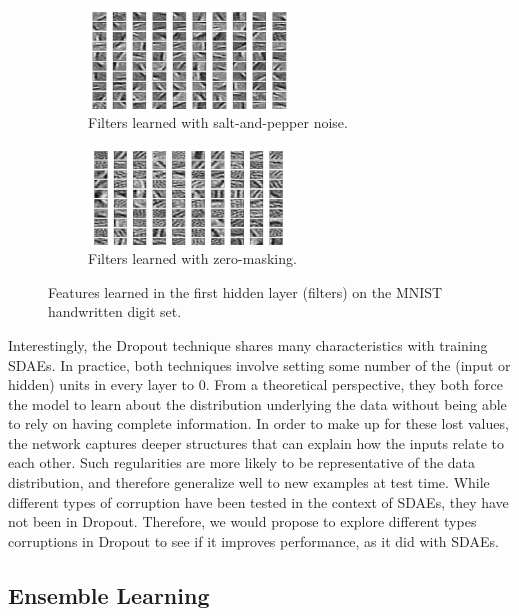 \documentclass{article} %
\begin{document}
\begin{figure}
\centering
\begin{subfigure}{.5\textwidth}
  \centering
  \includegraphics[width=150pt]{SDAE_Filters_SaltAndPepperNoise.png}
  \caption{Filters learned with salt-and-pepper noise.}
  \label{fig:filters_sp}
\end{subfigure}%
\begin{subfigure}{.5\textwidth}
  \centering
  \includegraphics[width=150pt]{SDAE_Filters_ZeroMasking.png}
  \caption{Filters learned with zero-masking.}
  \label{fig:filters_sp}
\end{subfigure}
\caption{Features learned in the first hidden layer (filters) on the MNIST handwritten digit set.}
\label{fig:filters}
\end{figure}

Interestingly, the Dropout technique shares many characteristics with training SDAEs. In practice, both techniques involve setting some number of the (input or hidden) units in every layer to 0. From a theoretical perspective, they both force the model to learn about the distribution underlying the data without being able to rely on having complete information. In order to make up for these lost values, the network captures deeper structures that can explain how the inputs relate to each other. Such regularities are more likely to be representative of the data distribution, and therefore generalize well to new examples at test time. While different types of corruption have been tested in the context of SDAEs, they have not been in Dropout. Therefore, we would propose to explore different types corruptions in Dropout to see if it improves performance, as it did with SDAEs.

\subsection{Ensemble Learning}
\end{document}

